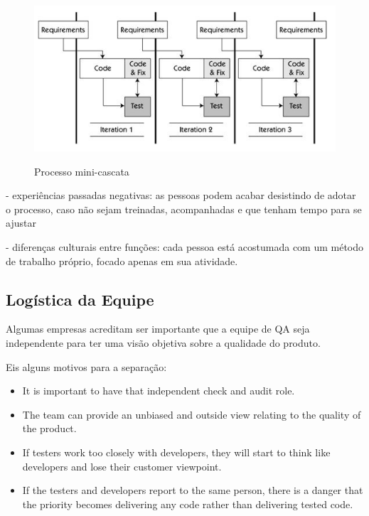 \documentclass[
	12pt,				%
	openright,			%
	oneside,			%
	a4paper,			%
	english,			%
	brazil,				%
	]{abntex2}
\begin{document}
\begin{figure}[H]
    \centering
    \caption{Processo mini-cascata}
    \graphicspath{ {./graphics/agile/} }
    \includegraphics[scale=1.0]{mini-waterfall}
    \label{fig:mini-waterfall}
\end{figure}

- experiências passadas negativas: as pessoas podem acabar desistindo de adotar o processo, caso não sejam treinadas, acompanhadas e que tenham tempo para se ajustar

- diferenças culturais entre funções: cada pessoa está acostumada com um método de trabalho próprio, focado apenas em sua atividade.

\subsection{Logística da Equipe}
Algumas empresas acreditam ser importante que a equipe de QA seja independente para ter uma visão objetiva sobre a qualidade do produto.

Eis alguns motivos para a separação:

\begin{itemize}
    \item It is important to have that independent check and audit role.
    \item The team can provide an unbiased and outside view relating to the quality of the product.
    \item If testers work too closely with developers, they will start to think like developers and lose their customer viewpoint.
    \item If the testers and developers report to the same person, there is a danger that the priority becomes delivering any code rather than delivering tested code.
\end{itemize}
\end{document}
